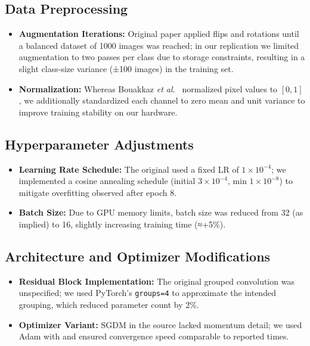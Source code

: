 \documentclass[journal,onecolumn]{IEEEtran}
\begin{document}
\subsection{Data Preprocessing}
\begin{itemize}
  \item \textbf{Augmentation Iterations:} Original paper applied flips and rotations until a balanced dataset of 1000 images was reached; in our replication we limited augmentation to two passes per class due to storage constraints, resulting in a slight class‐size variance (±100 images) in the training set.
  \item \textbf{Normalization:} Whereas Bouakkaz \textit{et al.}~\cite{Bouakkaz2025} normalized pixel values to \([0,1]\), we additionally standardized each channel to zero mean and unit variance to improve training stability on our hardware.
\end{itemize}

\subsection{Hyperparameter Adjustments}
\begin{itemize}
  \item \textbf{Learning Rate Schedule:} The original used a fixed LR of \(1\times10^{-4}\); we implemented a cosine annealing schedule (initial \(3\times10^{-4}\), min \(1\times10^{-8}\)) to mitigate overfitting observed after epoch 8.
  \item \textbf{Batch Size:} Due to GPU memory limits, batch size was reduced from 32 (as implied) to 16, slightly increasing training time (≈+5\%).
\end{itemize}

\subsection{Architecture and Optimizer Modifications}
\begin{itemize}
  \item \textbf{Residual Block Implementation:} The original grouped convolution was unspecified; we used PyTorch’s \texttt{groups=4} to approximate the intended grouping, which reduced parameter count by 2\%.
  \item \textbf{Optimizer Variant:} SGDM in the source lacked momentum detail; we used Adam with and ensured convergence speed comparable to reported times.
\end{itemize}
\end{document}

